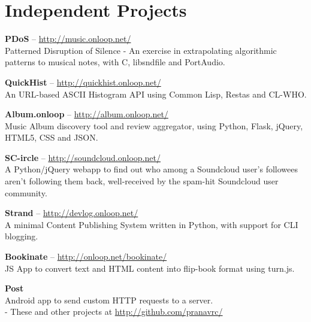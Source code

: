 \documentclass[10pt,a4paper]{moderncv}
\begin{document}

\section{Independent Projects}

\cvlistitem
{\textbf{PDoS} -- {{\href{http://music.onloop.net/}{\small http://music.onloop.net/}}}
  \\Patterned Disruption of Silence - An exercise in extrapolating algorithmic patterns to musical notes, with C, libsndfile and PortAudio.}

\cvlistitem
{\textbf{QuickHist} -- {{\href{http://quickhist.onloop.net/}{\small http://quickhist.onloop.net/}}}
  \\An URL-based ASCII Histogram API using Common Lisp, Restas and CL-WHO.}

\cvlistitem
{\textbf{Album.onloop} -- {{\href{http://album.onloop.net/}{\small http://album.onloop.net/}}}
  \\Music Album discovery tool and review aggregator, using Python, Flask, jQuery, HTML5, CSS and JSON.}

\cvlistitem
{\textbf{SC-ircle} -- {{\href{http://soundcloud.onloop.net/}{\small http://soundcloud.onloop.net/}}}
  \\A Python/jQuery webapp to find out who among a Soundcloud user's followees aren't following them back, well-received by the spam-hit Soundcloud user community.}

\cvlistitem
{\textbf{Strand} -- {{\href{http://devlog.onloop.net}{\small http://devlog.onloop.net/}}}
  \\A minimal Content Publishing System written in Python, with support for CLI blogging.}

\cvlistitem
{\textbf{Bookinate} -- {{\href{http://onloop.net/bookinate}{\small http://onloop.net/bookinate/}}}
  \\JS App to convert text and HTML content into flip-book format using turn.js.}

\cvlistitem
{\textbf{Post}
 \\Android app to send custom HTTP requests to a server.\\ - These and other projects at {\href{http://github.com/pranavrc}{http://github.com/pranavrc/}}}


\end{document}
